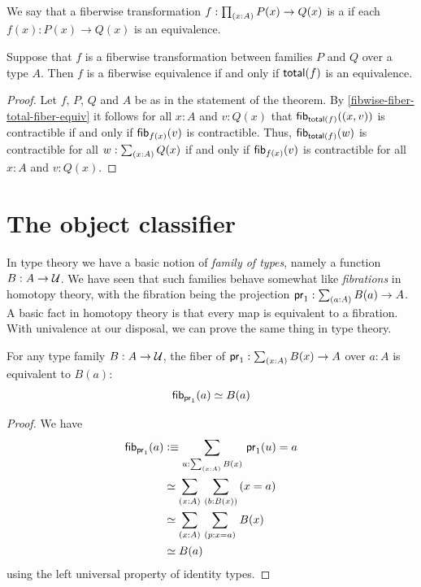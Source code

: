 We say that a fiberwise transformation $f:\prd{x:A} P(x)\to Q(x)$ is a %
%
if each $f(x):P(x) \to Q(x)$ is an equivalence.

\begin{thm}\label{thm:total-fiber-equiv}
Suppose that $f$ is a fiberwise transformation between families
$P$ and $Q$ over a type $A$.
Then $f$ is a fiberwise equivalence if and only if $\mathsf{total}(f)$ is an equivalence.
\end{thm}

\begin{proof}
Let $f$, $P$, $Q$ and $A$ be as in the statement of the theorem.
By \cref{fibwise-fiber-total-fiber-equiv} it follows for all
$x:A$ and $v:Q(x)$ that
${\mathsf{fib}}_{\mathsf{total}(f)}({\mathopen{}(x,v)\mathclose{}})$ is contractible if and only if
${\mathsf{fib}}_{f(x)}(v)$ is contractible.
Thus, ${\mathsf{fib}}_{\mathsf{total}(f)}(w)$ is contractible for all $w:\sm{x:A}Q(x)$ if and only if ${\mathsf{fib}}_{f(x)}(v)$ is contractible for all $x:A$ and $v:Q(x)$.
\end{proof}

%


\section{The object classifier}
\label{sec:object-classification}

In type theory we have a basic notion of \emph{family of types}, namely a function $B:A\to\mathcal{U}$.
We have seen that such families behave somewhat like \emph{fibrations} in homotopy theory, with the fibration being the projection $\proj1:\sm{a:A} B(a) \to A$.
A basic fact in homotopy theory is that every map is equivalent to a fibration.
With univalence at our disposal, we can prove the same thing in type theory.

\begin{lem}\label{thm:fiber-of-a-fibration}
  For any type family $B:A\to\mathcal{U}$, the fiber of $\proj1:\sm{x:A} B(x) \to A$ over $a:A$ is equivalent to $B(a)$:
  \[ {\mathsf{fib}}_{\mathsf{pr}_{1}}(a) \simeq B(a) \]
\end{lem}
\begin{proof}
  We have
  \begin{align*}
    \hfib{\proj1}{a} &\defeq \sm{u:\sm{x:A} B(x)} \proj1(u)=a\\
    &\eqvsym \sm{x:A}{b:B(x)} (x=a)\\
    &\eqvsym \sm{x:A}{p:x=a} B(x)\\
    &\eqvsym B(a)
  \end{align*}
  using the left universal property of identity types.
\end{proof}

